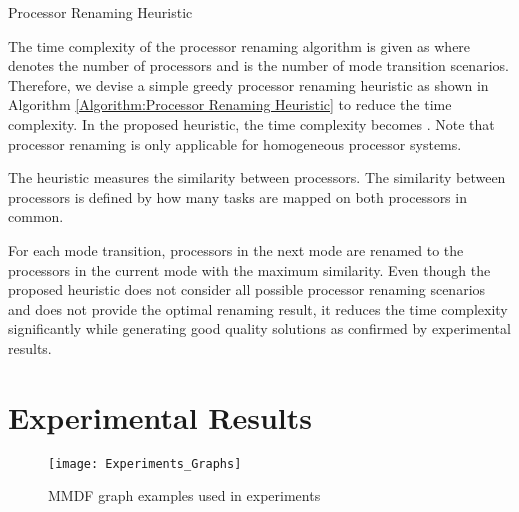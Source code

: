 \documentclass[prodmode,acmtecs]{acmsmall}
\begin{document}
\begin{algorithm}[t]
\SetAlgoNoLine
{}
\caption{Processor Renaming Heuristic}
\label{Algorithm:Processor Renaming Heuristic}
\end{algorithm}

The time complexity of the processor renaming algorithm is given as  where  denotes the number of processors and  is the number of mode transition scenarios. Therefore, we devise a simple greedy processor renaming heuristic as shown in Algorithm \ref{Algorithm:Processor Renaming Heuristic} to reduce the time complexity. In the proposed heuristic, the time complexity becomes . Note that processor renaming is only applicable for homogeneous processor systems.

The heuristic measures the similarity between processors. The similarity between processors is defined by how many tasks are mapped on both processors in common.

\begin{definition}
\label{Definition:Similarity between processors}

\end{definition}

For each mode transition, processors in the next mode are renamed to the processors in the current mode with the maximum similarity. Even though the proposed heuristic does not consider all possible processor renaming scenarios and does not provide the optimal renaming result, it reduces the time complexity significantly while generating good quality solutions as confirmed by experimental results.

\section{Experimental Results}
\label{Section:Experimental Result}

\begin{figure} [ht]
\centerline{\texttt{[image: Experiments\_Graphs]}}
\caption{MMDF graph examples used in experiments}
\label{Figure:Experiments Graphs}
\end{figure}
\end{document}
